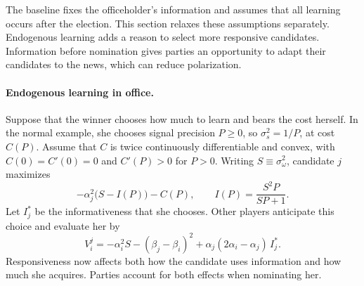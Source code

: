 \documentclass[12pt,letterpaper]{article}
\begin{document}
The baseline fixes the officeholder's information and assumes that all learning occurs after the election. This section relaxes these assumptions separately. Endogenous learning adds a reason to select more responsive candidates. Information before nomination gives parties an opportunity to adapt their candidates to the news, which can reduce polarization.

\paragraph{Endogenous learning in office.}
Suppose that the winner chooses how much to learn and bears the cost herself. In the normal example, she chooses signal precision $P\ge0$, so $\sigma_s^2=1/P$, at cost $C(P)$. Assume that $C$ is twice continuously differentiable and convex, with $C(0)=C'(0)=0$ and $C'(P)>0$ for $P>0$. Writing $S\equiv\sigma_\omega^2$, candidate $j$ maximizes
\[
-\alpha_j^2\big(S-I(P)\big)-C(P),
\qquad
I(P)=\frac{S^2P}{SP+1}.
\]
Let $I_j^*$ be the informativeness that she chooses. Other players anticipate this choice and evaluate her by
\[
V_i^j=-\alpha_i^2S-(\beta_j-\beta_i)^2+\alpha_j(2\alpha_i-\alpha_j)\,I_j^*.
\]
Responsiveness now affects both how the candidate uses information and how much she acquires. Parties account for both effects when nominating her.
\end{document}

